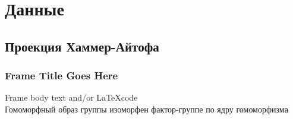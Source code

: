 \documentclass[14pt,aspectratio=43]{beamer}
\begin{document}
\section{Данные}\label{sub:smthzd}
\subsection{Проекция Хаммер-Айтофа}\label{sub:hammer}
\begin{frame}[<alignment>]
\frametitle{Frame Title Goes Here}
Frame body text and/or \LaTeX code\\



Гомоморфный образ группы
изоморфен фактор-группе
по ядру гомоморфизма

\end{frame}	
\end{document}
